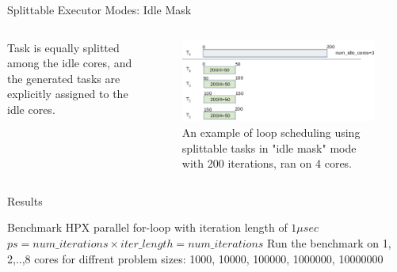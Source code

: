 \documentclass[10pt]{beamer}
\begin{document}
	\begin{frame}{Splittable Executor Modes: Idle Mask}
		\begin{outline}
			\begin{columns}		
				{Task is equally splitted among the idle cores, and the generated tasks are explicitly assigned to the idle cores.}
				\begin{figure}[]
					\includegraphics[width=0.99\linewidth]{images/spt_idle_mask.png}
					\caption{An example of loop scheduling using splittable tasks in "idle mask" mode with 200 iterations, ran on 4 cores.}
				\end{figure}				
			\end{columns}
		\end{outline}
	\end{frame}
	
	
	\begin{frame}{Results}
		\begin{outline}	
			\1Benchmark
			\2 HPX parallel for-loop with iteration length of $1{\mu}sec$
			\2 $ps = num\_{iterations}\times{iter\_{length}}=num\_{iterations}$
			\2 Run the benchmark on 1, 2,..,8 cores for diffrent problem sizes: 1000, 10000, 100000, 1000000, 10000000 
		\end{outline}
	\end{frame}
		
\end{document}
